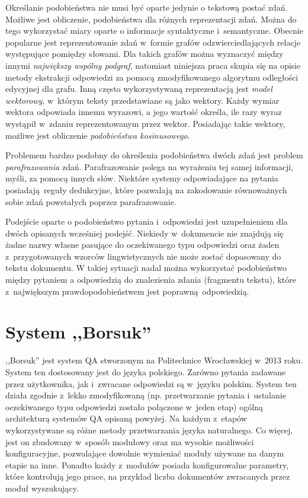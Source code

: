 \documentclass[a4paper, twoside, openright, 12pt]{report}
\begin{document}
            Określanie podobieństwa nie musi być oparte jedynie o tekstową postać zdań. Możliwe jest obliczenie,
            podobieństwa dla różnych reprezentacji zdań. Można do tego wykorzystać miary oparte o informacje syntaktyczne
            i~semantyczne. Obecnie popularne jest reprezentowanie zdań w~formie grafów odzwierciedlających relacje
            występujące pomiędzy słowami. Dla takich grafów można wyznaczyć między innymi \emph{największy wspólny podgraf},
            natomiast niniejsza praca skupia się na opisie metody ekstrakcji odpowiedzi za pomocą zmodyfikowanego
            algorytmu odległości edycyjnej dla grafu. Inną często wykorzystywaną reprezentacją jest \emph{model wektorowy},
            w~którym teksty przedstawiane są jako wektory. Każdy wymiar wektora odpowiada innemu wyrazowi, a jego wartość
            określa, ile razy wyraz wystąpił w~zdaniu reprezentowanym przez wektor. Posiadając takie wektory, możliwe jest
            obliczenie \emph{podobieństwa kosinusowego}\cite{SPEECHANDLANGUAGEPROCESSING}.

            Problemem bardzo podobny do określenia podobieństwa dwóch zdań jest problem \emph{parafrazowania} zdań.
            Parafrazowanie polega na wyrażeniu tej samej informacji, myśli, za pomocą innych słów. Niektóre systemy
            odpowiadające na pytania posiadają reguły dedukcyjne, które pozwalają na zakodowanie równoważnych sobie
            zdań powstałych poprzez parafrazowanie\cite{INFERENCE}.

            Podejście oparte o podobieństwo pytania i~odpowiedzi jest uzupełnieniem dla dwóch opisanych wcześniej podejść.
            Niekiedy w~dokumencie nie znajdują się żadne nazwy własne pasujące do oczekiwanego typu odpowiedzi
            oraz żaden z~przygotowanych wzorców lingwistycznych nie może zostać dopasowany do tekstu dokumentu.
            W takiej sytuacji nadal można wykorzystać podobieństwo między pytaniem a odpowiedzią do znalezienia
            zdania (fragmentu tekstu), które z~największym prawdopodobieństwem jest poprawną odpowiedzią.

    \section{System ,,Borsuk''} \label{BORSUKDESC}
        ,,Borsuk'' jest system QA stworzonym na Politechnice Wrocławskiej w~2013 roku. System ten dostosowany jest
        do języka polskiego. Zarówno pytania zadawane przez użytkownika, jak i~zwracane odpowiedzi są w~języku polskim.
        System ten działa zgodnie z~lekko zmodyfikowaną (np. przetwarzanie pytania i~ustalanie oczekiwanego typu odpowiedzi
        zostało połączone w~jeden etap) ogólną architekturą systemów QA opisaną powyżej.
        Na każdym z~etapów wykorzystywane są
        różne metody przetwarzania języka naturalnego. Co więcej, jest on zbudowany w~sposób modułowy oraz ma
        wysokie możliwości konfiguracyjne, pozwalające dowolnie wymieniać moduły używane na danym etapie na inne.
        Ponadto każdy z~modułów posiada konfigurowalne parametry, które kontrolują jego prace, na przykład liczba
        dokumentów zwracanych przez moduł wyszukujący.
\end{document}
